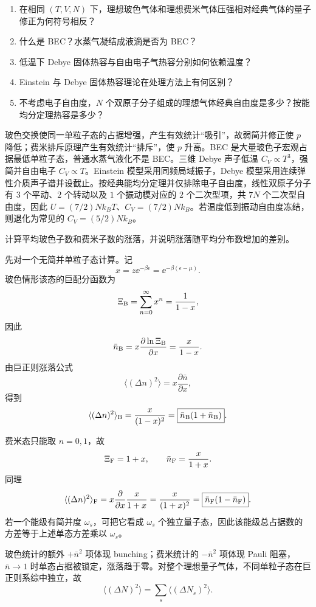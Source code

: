
\begin{question}[25 分]
\begin{enumerate}
\item 在相同 $(T,V,N)$ 下，理想玻色气体和理想费米气体压强相对经典气体的量子修正为何符号相反？
\item 什么是 BEC？水蒸气凝结成液滴是否为 BEC？
\item 低温下 Debye 固体热容与自由电子气热容分别如何依赖温度？
\item Einstein 与 Debye 固体热容理论在处理方法上有何区别？
\item 不考虑电子自由度，$N$ 个双原子分子组成的理想气体经典自由度是多少？按能均分定理热容是多少？
\end{enumerate}
\begin{solution}
玻色交换使同一单粒子态的占据增强，产生有效统计“吸引”，故弱简并修正使 $p$ 降低；费米排斥原理产生有效统计“排斥”，使 $p$ 升高。BEC 是大量玻色子宏观占据最低单粒子态，普通水蒸气液化不是 BEC。三维 Debye 声子低温 $C_V\propto T^3$，强简并自由电子 $C_V\propto T$。Einstein 模型采用同频局域振子，Debye 模型采用连续弹性介质声子谱并设截止。按经典能均分定理并仅排除电子自由度，线性双原子分子有 $3$ 个平动、$2$ 个转动以及 $1$ 个振动模对应的 $2$ 个二次型项，共 $7N$ 个二次型自由度，因此 $U=(7/2)Nk_BT$、$\boxed{C_V=(7/2)Nk_B}$。若温度低到振动自由度冻结，则退化为常见的 $C_V=(5/2)Nk_B$。
\end{solution}
\end{question}

\begin{question}[15 分]
计算平均玻色子数和费米子数的涨落，并说明涨落随平均分布数增加的差别。
\begin{solution}
先对一个无简并单粒子态计算。记
\[
x=z\ee^{-\beta\epsilon}=\ee^{-\beta(\epsilon-\mu)}.
\]
玻色情形该态的巨配分函数为
\[
\Xi_{\rm B}=\sum_{n=0}^{\infty}x^n=\frac{1}{1-x},
\]
因此
\[
\bar n_{\rm B}=x\frac{\partial\ln\Xi_{\rm B}}{\partial x}=\frac{x}{1-x}.
\]
由巨正则涨落公式
\[
\langle(\Delta n)^2\rangle=x\frac{\partial\bar n}{\partial x},
\]
得到
\[
\langle(\Delta n)^2\rangle_{\rm B}
=\frac{x}{(1-x)^2}
=\boxed{\bar n_{\rm B}(1+\bar n_{\rm B})}.
\]

费米态只能取 $n=0,1$，故
\[
\Xi_{\rm F}=1+x,\qquad
\bar n_{\rm F}=\frac{x}{1+x}.
\]
同理
\[
\langle(\Delta n)^2\rangle_{\rm F}
=x\frac{\partial}{\partial x}\frac{x}{1+x}
=\frac{x}{(1+x)^2}
=\boxed{\bar n_{\rm F}(1-\bar n_{\rm F})}.
\]
若一个能级有简并度 $\omega_s$，可把它看成 $\omega_s$ 个独立量子态，因此该能级总占据数的方差等于上述单态方差乘以 $\omega_s$。

玻色统计的额外 $+\bar n^2$ 项体现 bunching；费米统计的 $-\bar n^2$ 项体现 Pauli 阻塞，$\bar n\to1$ 时单态占据被锁定，涨落趋于零。对整个理想量子气体，不同单粒子态在巨正则系综中独立，故
\[
\boxed{\langle(\Delta N)^2\rangle=\sum_s\langle(\Delta N_s)^2\rangle}.
\]
\end{solution}
\end{question}

